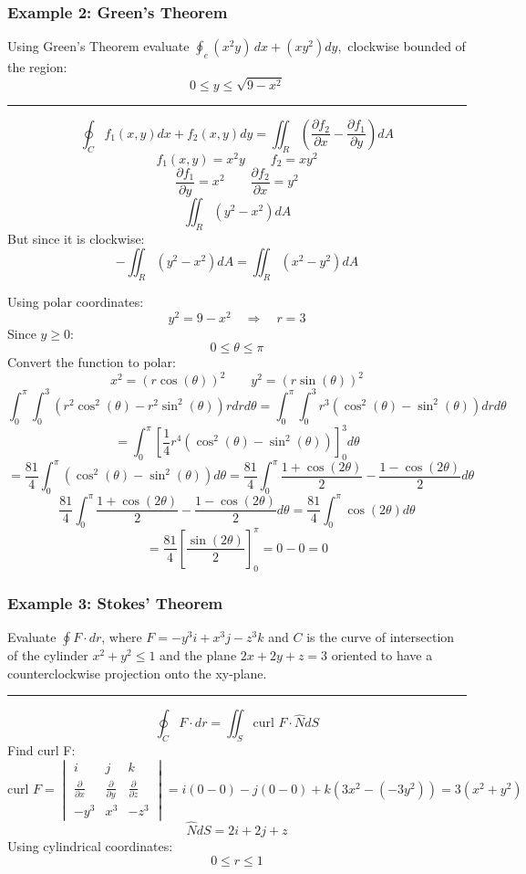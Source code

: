 \subsubsection{Example 2: Green's Theorem}
Using Green's Theorem evaluate $\oint_{e}(x^{2}y)\,d x+(x y^{2})d y,$ clockwise bounded of the region:
$$0\leq y\leq{\sqrt{9-x^{2}}}$$

\rule{\textwidth}{0.5pt}

$$\oint_{ C } f_1(x, y) d x+f_2(x, y) d y=\iint_{ R }\left(\frac{\partial f_2}{\partial x}-\frac{\partial f_1}{\partial y}\right) d A$$
$$f_1(x,y)=x^2y\qquad f_2=xy^2$$
$$\frac{\partial f_1}{\partial y}=x^2 \qquad \frac{\partial f_2}{\partial x}=y^2$$
$$\iint_{ R }\left(y^2-x^2\right) d A$$
But since it is clockwise:
$$-\iint_{ R }\left(y^2-x^2\right) d A=\iint_{ R }\left(x^2-y^2\right) d A$$

Using polar coordinates:
$$y^2=9-x^2\quad\Rightarrow\quad r=3$$
Since $y\geq 0$:
$$0\leq\theta\leq\pi$$
Convert the function to polar:
$$x^2=(r\cos(\theta))^2\qquad y^2=(r\sin(\theta))^2$$
$$\int_0^\pi\int_0^3(r^2\cos^2(\theta)-r^2\sin^2(\theta))rdrd\theta =\int_0^\pi\int_0^3r^3(\cos^2(\theta)-\sin^2(\theta))drd\theta$$
$$=\int_0^\pi\left[\frac{1}{4}r^4(\cos^2(\theta)-\sin^2(\theta))\right]_0^3d\theta$$
$$=\frac{81}{4}\int_0^\pi(\cos^2(\theta)-\sin^2(\theta))d\theta=\frac{81}{4}\int_0^\pi\frac{1+\cos(2\theta)}{2}-\frac{1-\cos(2\theta)}{2} d\theta$$
$$\frac{81}{4}\int_0^\pi\frac{1+\cos(2\theta)}{2}-\frac{1-\cos(2\theta)}{2} d\theta=\frac{81}{4}\int_0^\pi \cos(2\theta) d\theta$$
$$=\frac{81}{4}\left[\frac{\sin(2\theta)}{2}\right]_0^\pi=0-0=0$$


\subsubsection{Example 3: Stokes' Theorem}
Evaluate $\oint F\cdot dr$, where $F=-y^3i+x^3j-z^3k$ and $C$ is the curve of intersection of the cylinder
$x^2+y^2\leq 1$ and the plane $2x+2y+z=3$ oriented to have a counterclockwise projection onto the xy-plane.

\rule{\textwidth}{0.5pt}

$$\oint_{C}F\cdot dr=\iint_{S}\text{curl }F\cdot\widehat{N}dS$$
Find curl F:
$$\text{curl }F=
\begin{vmatrix}
  i&j&k\\
\frac{ \partial  }{ \partial x } & \frac{ \partial  }{ \partial y } & \frac{ \partial  }{ \partial z } \\
-y^3&x^3&-z^3
\end{vmatrix}
=i(0-0)-j(0-0)+k(3x^2-(-3y^2))=3(x^2+y^2)
$$
$$\widehat{N}dS=2i+2j+z$$
Using cylindrical coordinates:
$$0\leq r\leq 1$$


